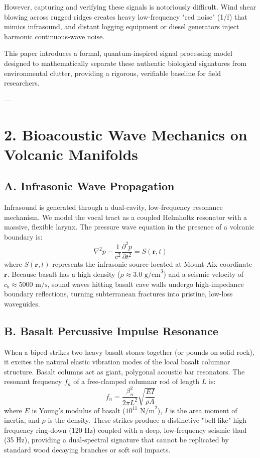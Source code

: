 \documentclass[11pt,twocolumn]{article}
\begin{document}
However, capturing and verifying these signals is notoriously difficult. Wind shear blowing across rugged ridges creates heavy low-frequency "red noise" (1/f) that mimics infrasound, and distant logging equipment or diesel generators inject harmonic continuous-wave noise. 

This paper introduces a formal, quantum-inspired signal processing model designed to mathematically separate these authentic biological signatures from environmental clutter, providing a rigorous, verifiable baseline for field researchers.

---

\section{2. Bioacoustic Wave Mechanics on Volcanic Manifolds}

\subsection{A. Infrasonic Wave Propagation}
Infrasound is generated through a dual-cavity, low-frequency resonance mechanism. We model the vocal tract as a coupled Helmholtz resonator with a massive, flexible larynx. The pressure wave equation in the presence of a volcanic boundary is:
$$\nabla^2 p - \frac{1}{c^2} \frac{\partial^2 p}{\partial t^2} = S(\mathbf{r}, t)$$
where $S(\mathbf{r}, t)$ represents the infrasonic source located at Mount Aix coordinate $\mathbf{r}$. Because basalt has a high density ($\rho \approx 3.0 \text{ g/cm}^3$) and a seismic velocity of $c_b \approx 5000 \text{ m/s}$, sound waves hitting basalt cave walls undergo high-impedance boundary reflections, turning subterranean fractures into pristine, low-loss waveguides.

\subsection{B. Basalt Percussive Impulse Resonance}
When a biped strikes two heavy basalt stones together (or pounds on solid rock), it excites the natural elastic vibration modes of the local basalt columnar structure. Basalt columns act as giant, polygonal acoustic bar resonators. The resonant frequency $f_n$ of a free-clamped columnar rod of length $L$ is:
$$f_n = \frac{\beta_n^2}{2\pi L^2} \sqrt{\frac{E I}{\rho A}}$$
where $E$ is Young's modulus of basalt ($10^{11} \text{ N/m}^2$), $I$ is the area moment of inertia, and $\rho$ is the density. These strikes produce a distinctive "bell-like" high-frequency ring-down (120 Hz) coupled with a deep, low-frequency seismic thud (35 Hz), providing a dual-spectral signature that cannot be replicated by standard wood decaying branches or soft soil impacts.
\end{document}
